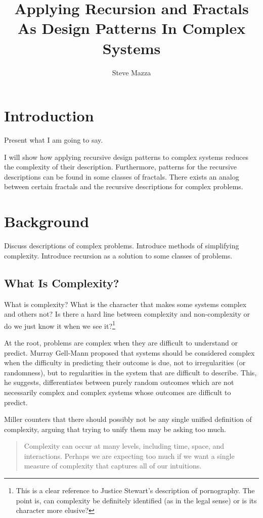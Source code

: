 \documentclass[jou,apacite]{apa6}
\title{Applying Recursion and Fractals As Design Patterns In Complex Systems}
\author{Steve Mazza}
\affiliation{Naval Postgraduate School}
\begin{document}
\maketitle    
                        
\section{Introduction}  %
Present what I am going to say.~\cite[page 112]{Mandelbrot}

I will show how applying recursive design patterns to complex systems reduces the complexity of their description.  Furthermore, patterns for the recursive descriptions can be found in some classes of fractals.  There exists an analog between certain fractals and the recursive descriptions for complex problems.

\section{Background}  %
Discuss descriptions of complex problems.  Introduce methods of simplifying complexity.  Introduce recursion as a solution to some classes of problems.
\subsection{What Is Complexity?}  %
What is complexity?  What is the character that makes some systems complex and others not?  Is there a hard line between complexity and non-complexity or do we just know it when we see it?\footnote{This is a clear reference to Justice Stewart's description of pornography.  The point is, can complexity be definitely identified (as in the legal sense) or is its character more elusive?}

At the root, problems are complex when they are difficult to understand or predict.  Murray Gell-Mann proposed that systems should be considered complex when the difficulty in predicting their outcome is due, not to irregularities (or randomness), but to regularities in the system that are difficult to describe.  This, he suggests, differentiates between purely random outcomes which are not necessarily complex and complex systems whose outcomes are difficult to
predict.~\cite{GellMann}

Miller counters that there should possibly not be any single unified definition of complexity, arguing that trying to unify them may be asking too much.
\begin{quotation}
  Complexity can occur at many levels, including time, space, and interactions.  Perhaps we are expecting too much if we want a single measure of complexity that captures all of our intuitions.~\cite[page 234]{Miller}
\end{quotation}
\end{document}
